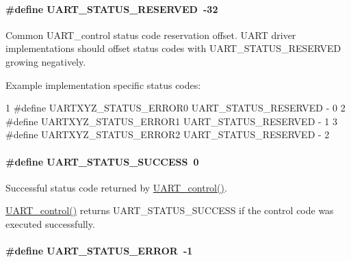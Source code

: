 \paragraph[{U\+A\+R\+T\+\_\+\+S\+T\+A\+T\+U\+S\+\_\+\+R\+E\+S\+E\+R\+V\+E\+D}]{\setlength{\rightskip}{0pt plus 5cm}\#define U\+A\+R\+T\+\_\+\+S\+T\+A\+T\+U\+S\+\_\+\+R\+E\+S\+E\+R\+V\+E\+D~-\/32}\label{_u_a_r_t_8h_a8f35027907fbab6a9ee302d2ee52a879}
Common U\+A\+R\+T\+\_\+control status code reservation offset. U\+A\+R\+T driver implementations should offset status codes with U\+A\+R\+T\+\_\+\+S\+T\+A\+T\+U\+S\+\_\+\+R\+E\+S\+E\+R\+V\+E\+D growing negatively.

Example implementation specific status codes\+: 
\begin{DoxyCode}
1 #define UARTXYZ\_STATUS\_ERROR0    UART\_STATUS\_RESERVED - 0
2 #define UARTXYZ\_STATUS\_ERROR1    UART\_STATUS\_RESERVED - 1
3 #define UARTXYZ\_STATUS\_ERROR2    UART\_STATUS\_RESERVED - 2
\end{DoxyCode}
\paragraph[{U\+A\+R\+T\+\_\+\+S\+T\+A\+T\+U\+S\+\_\+\+S\+U\+C\+C\+E\+S\+S}]{\setlength{\rightskip}{0pt plus 5cm}\#define U\+A\+R\+T\+\_\+\+S\+T\+A\+T\+U\+S\+\_\+\+S\+U\+C\+C\+E\+S\+S~0}\label{_u_a_r_t_8h_a101b7761f89b3ec49f0c6726669acfed}


Successful status code returned by \hyperlink{_u_a_r_t_8h_a9de3c26cfe4ce6b7f350a6ea6e16801d}{U\+A\+R\+T\+\_\+control()}. 

\hyperlink{_u_a_r_t_8h_a9de3c26cfe4ce6b7f350a6ea6e16801d}{U\+A\+R\+T\+\_\+control()} returns U\+A\+R\+T\+\_\+\+S\+T\+A\+T\+U\+S\+\_\+\+S\+U\+C\+C\+E\+S\+S if the control code was executed successfully. 
\paragraph[{U\+A\+R\+T\+\_\+\+S\+T\+A\+T\+U\+S\+\_\+\+E\+R\+R\+O\+R}]{\setlength{\rightskip}{0pt plus 5cm}\#define U\+A\+R\+T\+\_\+\+S\+T\+A\+T\+U\+S\+\_\+\+E\+R\+R\+O\+R~-\/1}\label{_u_a_r_t_8h_a2ae076f4aae13ca8e2aea674207df0ad}


